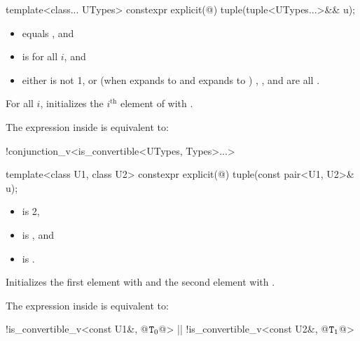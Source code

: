 %
\begin{itemdecl}
template<class... UTypes> constexpr explicit(@\seebelow@) tuple(tuple<UTypes...>&& u);
\end{itemdecl}

\begin{itemdescr}
\pnum
\constraints
\begin{itemize}
\item
{} equals , and

\item
{} is  for all $i$, and

\item
either
 is not 1, or
(when  expands to  and  expands to )
, ,
and  are all .
\end{itemize}

\pnum
\effects
For all $i$,
initializes the $i^\text{th}$ element of  with
.

\pnum
\remarks
The expression inside  is equivalent to:
\begin{codeblock}
!conjunction_v<is_convertible<UTypes, Types>...>
\end{codeblock}
\end{itemdescr}

%
%
\begin{itemdecl}
template<class U1, class U2> constexpr explicit(@\seebelow@) tuple(const pair<U1, U2>& u);
\end{itemdecl}

\begin{itemdescr}
\pnum
\constraints
\begin{itemize}
\item {} is 2,
\item {} is , and
\item {} is .
\end{itemize}

\pnum
\effects
Initializes the first element with  and the
second element with .

\pnum
The expression inside  is equivalent to:
\begin{codeblock}
!is_convertible_v<const U1&, @$\texttt{T}_0$@> || !is_convertible_v<const U2&, @$\texttt{T}_1$@>
\end{codeblock}
\end{itemdescr}

